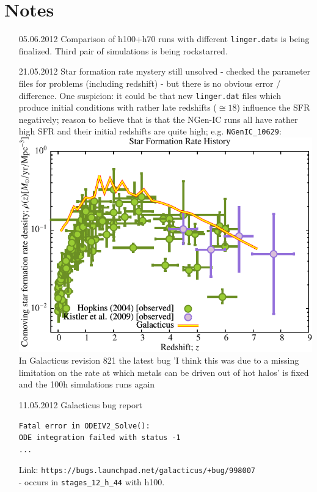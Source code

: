 
\chapter{Notes}
\begin{itemize}

\item[05.06.2012]
Comparison of h100+h70 runs with different \texttt{linger.dat}s 
is being finalized. Third pair of simulations is being rockstarred. \\

\item[21.05.2012]
Star formation rate mystery still unsolved - checked the parameter 
files for problems (including redshift) - but there is no obvious 
error / difference. One suspicion: it could be that new 
\texttt{linger.dat} files 
which produce initial conditions with rather late redshifts ($\cong 18$) 
influence the SFR negatively; reason to believe that is that the 
NGen-IC runs all have rather high SFR and their initial redshifts 
are quite high; e.g. \texttt{NGenIC\_10629}: \\
\includegraphics[scale=0.5]{r256/h100/NGenIC_10629/Plot_Star_Formation_History.pdf}\\
In Galacticus revision 821 the latest bug 'I think this was 
due to a missing limitation on the rate at which metals 
can be driven out of hot halos' is fixed and the 100h 
simulations runs again 


\item[11.05.2012]
Galacticus bug report 
\begin{verbatim}
Fatal error in ODEIV2_Solve():
ODE integration failed with status -1
...
\end{verbatim}
Link: \texttt{https://bugs.launchpad.net/galacticus/+bug/998007} \\ - 
occurs in \texttt{stages\_12\_h\_44} with h100. 


\end{itemize}
